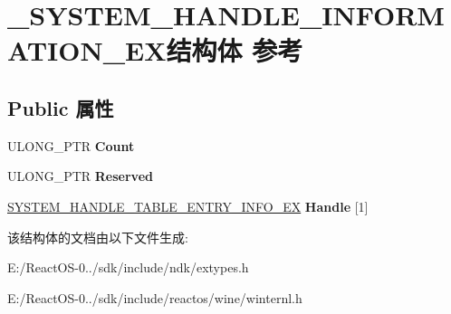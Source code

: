 \hypertarget{struct___s_y_s_t_e_m___h_a_n_d_l_e___i_n_f_o_r_m_a_t_i_o_n___e_x}{}\section{\+\_\+\+S\+Y\+S\+T\+E\+M\+\_\+\+H\+A\+N\+D\+L\+E\+\_\+\+I\+N\+F\+O\+R\+M\+A\+T\+I\+O\+N\+\_\+\+E\+X结构体 参考}
\label{struct___s_y_s_t_e_m___h_a_n_d_l_e___i_n_f_o_r_m_a_t_i_o_n___e_x}
\subsection*{Public 属性}
\begin{DoxyCompactItemize}
\item 
\mbox{\label{struct___s_y_s_t_e_m___h_a_n_d_l_e___i_n_f_o_r_m_a_t_i_o_n___e_x_ac8d5267f869dba8e98edbc2a892b57a4}} 
U\+L\+O\+N\+G\+\_\+\+P\+TR {\bfseries Count}
\item 
\mbox{\label{struct___s_y_s_t_e_m___h_a_n_d_l_e___i_n_f_o_r_m_a_t_i_o_n___e_x_acb30e4cbfdf3756cbcb3a16f06df975c}} 
U\+L\+O\+N\+G\+\_\+\+P\+TR {\bfseries Reserved}
\item 
\mbox{\label{struct___s_y_s_t_e_m___h_a_n_d_l_e___i_n_f_o_r_m_a_t_i_o_n___e_x_a80c5b13b6bb0153c46ae05ae54833154}} 
\hyperlink{struct___s_y_s_t_e_m___h_a_n_d_l_e___t_a_b_l_e___e_n_t_r_y___i_n_f_o___e_x}{S\+Y\+S\+T\+E\+M\+\_\+\+H\+A\+N\+D\+L\+E\+\_\+\+T\+A\+B\+L\+E\+\_\+\+E\+N\+T\+R\+Y\+\_\+\+I\+N\+F\+O\+\_\+\+EX} {\bfseries Handle} \mbox{[}1\mbox{]}
\end{DoxyCompactItemize}


该结构体的文档由以下文件生成\+:\begin{DoxyCompactItemize}
\item 
E\+:/\+React\+O\+S-\/0../sdk/include/ndk/extypes.\+h\item 
E\+:/\+React\+O\+S-\/0../sdk/include/reactos/wine/winternl.\+h\end{DoxyCompactItemize}
